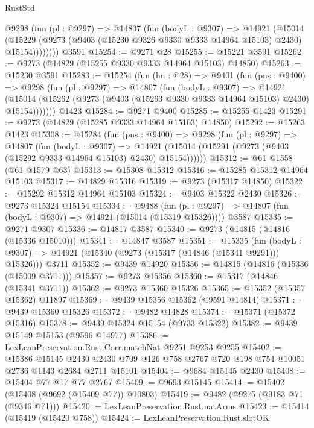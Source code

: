 \begin{lexlean}{RustStd}
\begin{coremodule}
        @9298
          (fun (pl : @9297) =>
          @14807
            (fun (bodyL : @9307) =>
            @14921
              (@15014
                (@15229 (@9273 (@9403 (@15230 @9326 @9330 @9333 @14964 @15103) @2430) @15154))))))))
    @3591
@15254 := @9271 @28
@15255 := @15221 @3591
@15262 := @9273 (@14829 (@15255 @9330 @9333 @14964 @15103) @14850)
@15263 := @15230 @3591
@15283 := @15254
    (fun (hn : @28) =>
    @9401
      (fun (pns : @9400) =>
      @9298
        (fun (pl : @9297) =>
        @14807
          (fun (bodyL : @9307) =>
          @14921
            (@15014 (@15262 (@9273 (@9403 (@15263 @9330 @9333 @14964 @15103) @2430) @15154)))))))
    @1423
@15284 := @9271 @9400
@15285 := @15255 @1423
@15291 := @9273 (@14829 (@15285 @9333 @14964 @15103) @14850)
@15292 := @15263 @1423
@15308 := @15284
    (fun (pns : @9400) =>
    @9298
      (fun (pl : @9297) =>
      @14807
        (fun (bodyL : @9307) =>
        @14921 (@15014 (@15291 (@9273 (@9403 (@15292 @9333 @14964 @15103) @2430) @15154))))))
@15312 := @61 @1558 (@61 @1579 @63)
@15313 := @15308 @15312
@15316 := @15285 @15312 @14964 @15103
@15317 := @14829 @15316
@15319 := @9273 (@15317 @14850)
@15322 := @15292 @15312 @14964 @15103
@15324 := @9403 @15322 @2430
@15326 := @9273 @15324 @15154
@15334 := @9488
    (fun (pl : @9297) => @14807 (fun (bodyL : @9307) => @14921 (@15014 (@15319 @15326))))
    @3587
@15335 := @9271 @9307
@15336 := @14817 @3587
@15340 := @9273 (@14815 (@14816 (@15336 @15010)))
@15341 := @14847 @3587
@15351 := @15335
    (fun (bodyL : @9307) => @14921 (@15340 (@9273 (@15317 (@14846 (@15341 @9291))) @15326)))
    @3711
@15352 := @9439 @14920
@15356 := @14815 (@14816 (@15336 (@15009 @3711)))
@15357 := @9273 @15356
@15360 := @15317 (@14846 (@15341 @3711))
@15362 := @9273 @15360 @15326
@15365 := @15352 (@15357 @15362) @11897
@15369 := @9439 @15356 @15362 (@9591 @14814)
@15371 := @9439 @15360 @15326
@15372 := @9482 @14828
@15374 := @15371 (@15372 @15316)
@15378 := @9439 @15324 @15154 (@9733 @15322)
@15382 := @9439 @15149 @15153 (@9596 @14977)
@15386 := LexLeanPreservation.Rust.Corr.matchNat @9251 @9253 @9255
@15402 := @15386
    @15145
    @2430
    @2430
    @709
    @126
    @758
    @2767
    @720
    @198
    @754
    @10051
    @2736
    @1143
    @2684
    @2711
    @15101
@15404 := @9684 @15145 @2430
@15408 := @15404 @77 @17 @77 @2767
@15409 := @9693 @15145
@15414 := @15402 (@15408 (@9692 (@15409 @77)) @10803)
@15419 := @9482 (@9275 (@9183 @71 (@9346 @71)))
@15420 := LexLeanPreservation.Rust.natArms
@15423 := @15414 (@15419 (@15420 @758))
@15424 := LexLeanPreservation.Rust.slotOK

\end{coremodule}
\end{lexlean}
